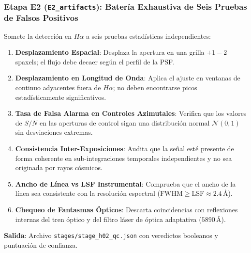 \documentclass[11pt,a4paper]{article}
\begin{document}
\subsubsection{Etapa E2 (\texttt{E2\_artifacts}): Batería Exhaustiva de Seis Pruebas de Falsos Positivos}
Somete la detección en $H\alpha$ a seis pruebas estadísticas independientes:
\begin{enumerate}[leftmargin=1.0cm]
    \item \textbf{Desplazamiento Espacial}: Desplaza la apertura en una grilla $\pm 1 - 2$ spaxels; el flujo debe decaer según el perfil de la PSF.
    \item \textbf{Desplazamiento en Longitud de Onda}: Aplica el ajuste en ventanas de continuo adyacentes fuera de $H\alpha$; no deben encontrarse picos estadísticamente significativos.
    \item \textbf{Tasa de Falsa Alarma en Controles Azimutales}: Verifica que los valores de $S/N$ en las aperturas de control sigan una distribución normal $\mathcal{N}(0, 1)$ sin desviaciones extremas.
    \item \textbf{Consistencia Inter-Exposiciones}: Audita que la señal esté presente de forma coherente en sub-integraciones temporales independientes y no sea originada por rayos cósmicos.
    \item \textbf{Ancho de Línea vs LSF Instrumental}: Comprueba que el ancho de la línea sea consistente con la resolución espectral ($\text{FWHM} \ge \text{LSF} \approx 2.4\,\text{\AA}$).
    \item \textbf{Chequeo de Fantasmas Ópticos}: Descarta coincidencias con reflexiones internas del tren óptico y del filtro láser de óptica adaptativa ($5890\,\text{\AA}$).
\end{enumerate}
\noindent\textbf{Salida}: Archivo \texttt{stages/stage\_h02\_qc.json} con veredictos booleanos y puntuación de confianza.
\end{document}
